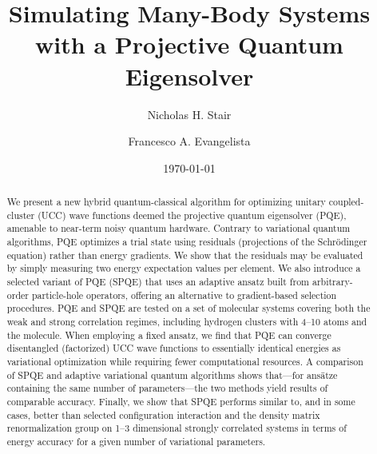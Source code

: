 \documentclass[aps,prx, reprint]{revtex4-2}
\begin{document}
\title{
Simulating Many-Body Systems with a Projective Quantum Eigensolver
}
\author{Nicholas H. Stair}
\author{Francesco A. Evangelista}
\date{\today}

\begin{abstract}
We present a new hybrid quantum-classical algorithm for optimizing unitary coupled-cluster (UCC) wave functions deemed the projective quantum eigensolver (PQE), amenable to near-term noisy quantum hardware.
Contrary to variational quantum algorithms, PQE optimizes a trial state using  residuals (projections of the Schr\"{o}dinger equation) rather than energy gradients.
We show that the residuals may be evaluated by simply measuring two energy expectation values per element.
We also introduce a selected variant of PQE (SPQE) that uses an adaptive ansatz built from arbitrary-order particle-hole operators, offering an alternative to gradient-based selection procedures.
PQE and SPQE are tested on a set of molecular systems covering both the weak and strong correlation regimes, including hydrogen clusters with 4--10 atoms and the  molecule.
When employing a fixed ansatz, we find that PQE can converge disentangled (factorized) UCC wave functions to essentially identical energies as variational optimization while requiring fewer computational resources.
A comparison of SPQE and adaptive variational quantum algorithms shows that---for ans\"{a}tze containing the same number of parameters---the two methods yield results of comparable accuracy.
Finally, we show that SPQE performs similar to, and in some cases, better than selected configuration interaction and the density matrix renormalization group on 1--3 dimensional strongly correlated  systems in terms of energy accuracy for a given number of variational parameters.

\end{abstract}

\maketitle
\end{document}
